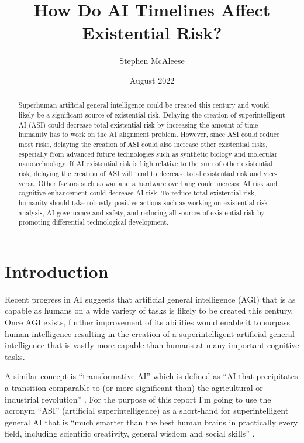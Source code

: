 \documentclass{article}
\title{How Do AI Timelines Affect Existential Risk?}
\author{Stephen McAleese}
\date{August 2022}
\begin{document}
\maketitle

\begin{abstract}

Superhuman artificial general intelligence could be created this century and would likely be a significant source of existential risk. Delaying the creation of superintelligent AI (ASI) could decrease total existential risk by increasing the amount of time humanity has to work on the AI alignment problem. However, since ASI could reduce most risks, delaying the creation of ASI could also increase other existential risks, especially from advanced future technologies such as synthetic biology and molecular nanotechnology. If AI existential risk is high relative to the sum of other existential risk, delaying the creation of ASI will tend to decrease total existential risk and vice-versa. Other factors such as war and a hardware overhang could increase AI risk and cognitive enhancement could decrease AI risk. To reduce total existential risk, humanity should take robustly positive actions such as working on existential risk analysis, AI governance and safety, and reducing all sources of existential risk by promoting differential technological development.

\end{abstract}

\tableofcontents

\section{Introduction}

Recent progress in AI suggests that artificial general intelligence (AGI) that is as capable as humans on a wide variety of tasks is likely to be created this century. Once AGI exists, further improvement of its abilities would enable it to surpass human intelligence resulting in the creation of a superintelligent artificial general intelligence that is vastly more capable than humans at many important cognitive tasks.

A similar concept is “transformative AI” which is defined as “AI that precipitates a transition comparable to (or more significant than) the agricultural or industrial revolution” \cite{tai}. For the purpose of this report I’m going to use the acronym “ASI” (artificial superintelligence) as a short-hand for superintelligent general AI that is “much smarter than the best human brains in practically every field, including scientific creativity, general wisdom and social skills” \cite{bostrom1998}.
\end{document}
